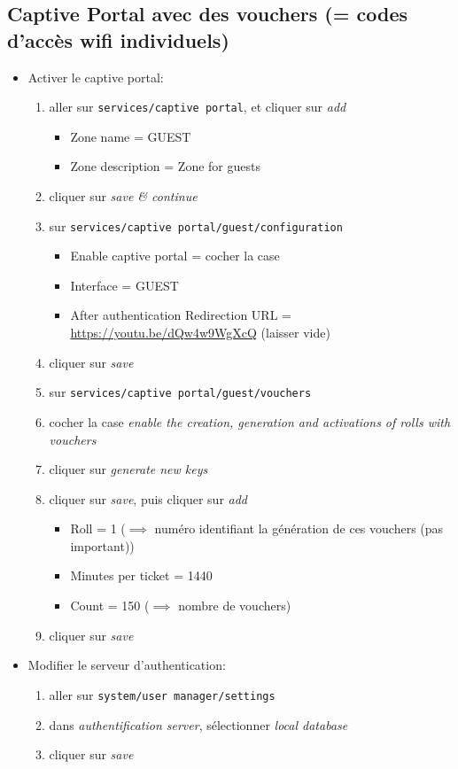 \documentclass[a4paper]{article}
\begin{document}
\subsection{Captive Portal avec des vouchers (= codes d'accès wifi individuels)}





\begin{itemize}

\item Activer le captive portal:
\begin{enumerate}
    \item aller sur \texttt{services/captive portal}, et cliquer sur \textit{add}
    \begin{itemize}
        \item Zone name = GUEST
        \item Zone description = Zone for guests
    \end{itemize}
    \item cliquer sur \textit{save \& continue}
    \item sur \texttt{services/captive portal/guest/configuration}
    \begin{itemize}
        \item Enable captive portal = cocher la case
        \item Interface = GUEST
        \item After authentication Redirection URL = \url{https://youtu.be/dQw4w9WgXcQ} (laisser vide)
    \end{itemize}
    \item cliquer sur \textit{save}
    \item sur \texttt{services/captive portal/guest/vouchers}
    \item cocher la case \textit{enable the creation, generation and activations of rolls with vouchers}
    \item cliquer sur \textit{generate new keys}
    \item cliquer sur \textit{save}, puis cliquer sur \textit{add}
    \begin{itemize}
        \item Roll = 1 ($\implies$ numéro identifiant la génération de ces vouchers (pas important))
        \item Minutes per ticket = 1440
        \item Count = 150 ($\implies$ nombre de vouchers)
    \end{itemize}
    \item cliquer sur \textit{save}
\end{enumerate}

\item Modifier le serveur d'authentication:
\begin{enumerate}
    \item aller sur \texttt{system/user manager/settings}
    \item dans \textit{authentification server}, sélectionner \textit{local database}
    \item cliquer sur \textit{save}
\end{enumerate}

\end{itemize}
\end{document}
